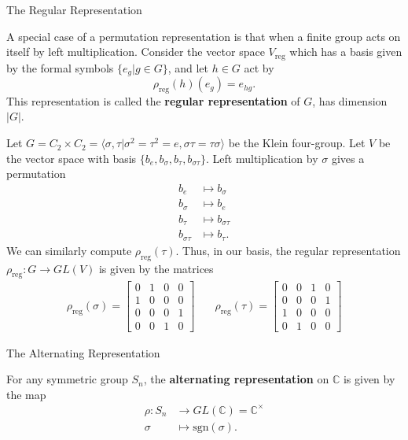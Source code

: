 \begin{frame}{The Regular Representation}
\begin{example}
A special case of a permutation representation is that when a finite group acts on itself by left multiplication. Consider the vector space $V_{\text{reg}}$ which has a basis given by the formal symbols $\{ e_g | g \in G \}$, and let $h \in G$ act by \[\rho_{\text{reg}}(h) (e_g) = e_{hg}.\]  This representation is called the \textbf{regular representation} of $G$, has dimension $|G|$.  
 \end{example}
\end{frame}

\begin{frame}[plain]
\begin{example}
Let $G= C_2 \times C_2 = \langle \sigma, \tau | \sigma^2 = \tau^2 = e, \sigma \tau = \tau \sigma \rangle$ be the Klein four-group.  Let $V$ be the vector space with basis $\{ b_e, b_\sigma, b_\tau, b_{\sigma \tau} \}$.  Left multiplication by $\sigma$ gives a permutation 
\begin{align*}
b_e &\mapsto b_\sigma\\
b_\sigma &\mapsto b_e \\
b_ \tau &\mapsto b_{\sigma \tau}\\
b_{\sigma \tau} &\mapsto b_\tau.
\end{align*}
We can similarly compute $\rho_{\text{reg}}(\tau)$.  Thus, in our basis, the regular representation $\rho_{\text{reg}} \colon G \to GL(V)$  is given by the matrices
\begin{align*}
 \rho_{\text{reg}}(\sigma) = \begin{bmatrix}0 & 1 & 0 & 0 \\  1 & 0 & 0 & 0 \\ 0 & 0 & 0 & 1 \\ 0 & 0 & 1 & 0 \end{bmatrix} & \quad \rho_{\text{reg}}(\tau) = \begin{bmatrix}0&0&1&0 \\ 0&0&0&1 \\ 1&0&0&0 \\ 0&1&0&0 \end{bmatrix} \end{align*}
\end{example}
\end{frame}

\begin{frame}{The Alternating Representation}
\begin{example}
For any symmetric group $S_n$, the \textbf{alternating representation} on $\mathbb{C}$ is given by the map 
\begin{align*}
\rho \colon S_n &\to GL(\mathbb{C})=\mathbb{C}^\times \\
\sigma & \mapsto \text{sgn}(\sigma).
\end{align*}
\end{example}
\end{frame}

